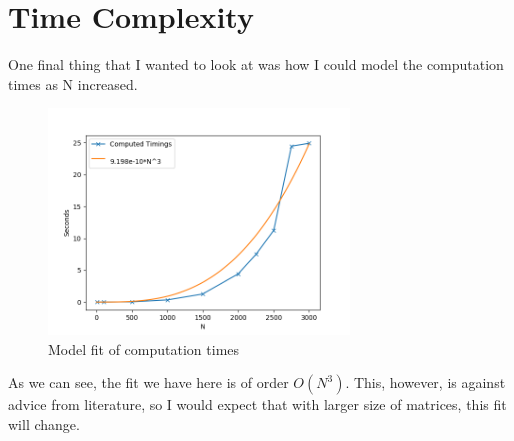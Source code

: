 \section{Time Complexity}
One final thing that I wanted to look at was how I could model the computation times as N increased.
\begin{figure}[H]
    \begin{center}
        \includegraphics[width=8cm]{../images/model_fit.png}
        \caption{Model fit of computation times}
    \end{center}
\end{figure}

As we can see, the fit we have here is of order $O(N^3)$. This, however, is against advice from literature, so I would expect that with larger size of matrices, this fit will change.
